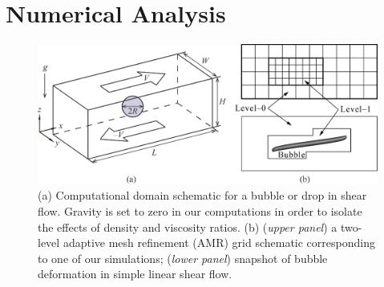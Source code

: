 \documentclass[review]{elsarticle}
\begin{document}
\section{Numerical Analysis}
% 
\begin{figure}%
  \includegraphics[width=\textwidth]{1-SchematicAndGrid}
  \caption{(a) Computational domain schematic for a bubble or drop in shear 
           flow.  Gravity is set to zero in our computations in order to isolate
           the effects of density and viscosity ratios.  
           (b) (\textit{upper panel}) a two-level adaptive mesh 
           refinement (AMR) grid schematic corresponding to one of our
           simulations;
           (\textit{lower panel}) snapshot of bubble deformation 
           in simple linear shear flow.}
  \label{fig:SchemAndGrid}
\end{figure}
%
\end{document}
